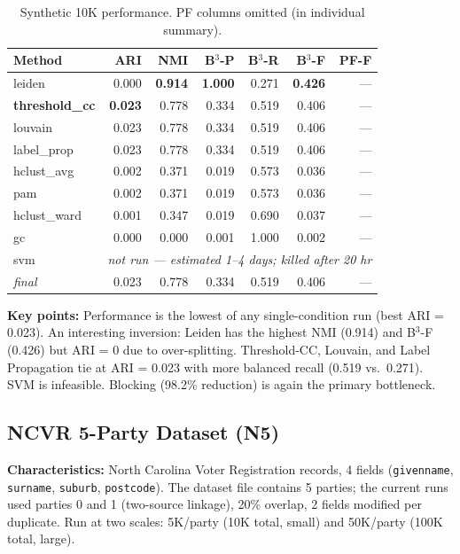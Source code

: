 \documentclass[11pt, a4paper]{article}
\newcommand{\good}[1]{{\color{good}\textbf{#1}}}
\newcommand{\na}{---}
\begin{document}
\begin{table}[h!]
\centering
\small
\setlength{\tabcolsep}{4pt}
\begin{tabular}{lrrrrrr}
\toprule
\textbf{Method} & \textbf{ARI} & \textbf{NMI} & \textbf{B$^3$-P} & \textbf{B$^3$-R} & \textbf{B$^3$-F} & \textbf{PF-F} \\
\midrule
leiden               & 0.000 & \good{0.914} & \good{1.000} & 0.271 & \good{0.426} & \na \\
\good{threshold\_cc} & \good{0.023} & 0.778 & 0.334 & 0.519 & 0.406 & \na \\
louvain              & 0.023 & 0.778 & 0.334 & 0.519 & 0.406 & \na \\
label\_prop          & 0.023 & 0.778 & 0.334 & 0.519 & 0.406 & \na \\
hclust\_avg          & 0.002 & 0.371 & 0.019 & 0.573 & 0.036 & \na \\
pam                  & 0.002 & 0.371 & 0.019 & 0.573 & 0.036 & \na \\
hclust\_ward         & 0.001 & 0.347 & 0.019 & 0.690 & 0.037 & \na \\
gc                   & 0.000 & 0.000 & 0.001 & 1.000 & 0.002 & \na \\
svm                  & \multicolumn{6}{c}{\textit{not run --- estimated 1--4 days; killed after 20 hr}} \\
\midrule
\textit{final}       & 0.023 & 0.778 & 0.334 & 0.519 & 0.406 & \na \\
\bottomrule
\end{tabular}
\caption{Synthetic 10K performance. PF columns omitted (in individual summary).}
\end{table}

\textbf{Key points:} Performance is the lowest of any single-condition run (best ARI = 0.023).
An interesting inversion: Leiden has the highest NMI (0.914) and B$^3$-F (0.426) but ARI = 0
due to over-splitting. Threshold-CC, Louvain, and Label Propagation tie at ARI = 0.023 with more
balanced recall (0.519 vs.\ 0.271). SVM is infeasible. Blocking (98.2\% reduction) is again
the primary bottleneck.

\subsection{NCVR 5-Party Dataset (N5)}

\textbf{Characteristics:} North Carolina Voter Registration records, 4 fields
(\texttt{givenname}, \texttt{surname}, \texttt{suburb}, \texttt{postcode}).
The dataset file contains 5 parties; the current runs used parties 0 and 1
(two-source linkage), 20\% overlap, 2 fields modified per duplicate.
Run at two scales: 5K/party (10K total, small) and 50K/party (100K total, large).
\end{document}
